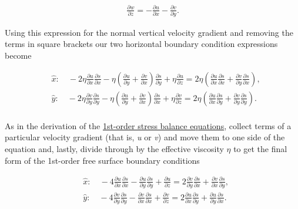\begin{align*}
\frac{\partial w}{\partial z}=-\frac{\partial u}{\partial x}-\frac{\partial v}{\partial y}.
\end{align*}

Using this expression for the normal vertical velocity gradient and removing the terms in square brackets our two horizontal boundary condition expressions become

\begin{align*}
   {} & \hat{x}:\quad -2\eta \frac{\partial u}{\partial x}\frac{\partial s}{\partial x}-\eta \left( \frac{\partial u}{\partial y}+\frac{\partial v}{\partial x} \right)\frac{\partial s}{\partial y}+\eta \frac{\partial u}{\partial z}=2\eta \left( \frac{\partial u}{\partial x}\frac{\partial s}{\partial x}+\frac{\partial v}{\partial y}\frac{\partial s}{\partial x} \right),  \\
   {} & \hat{y}:\quad -2\eta \frac{\partial v}{\partial y}\frac{\partial s}{\partial y}-\eta \left( \frac{\partial u}{\partial y}+\frac{\partial v}{\partial x} \right)\frac{\partial s}{\partial x}+\eta \frac{\partial v}{\partial z}=2\eta \left( \frac{\partial u}{\partial x}\frac{\partial s}{\partial y}+\frac{\partial v}{\partial y}\frac{\partial s}{\partial y} \right).  \\
\end{align*}

As in the derivation of the \href{http://websrv.cs.umt.edu/isis/index.php/Blatter-Pattyn_model}{1st-order stress balance equations}, collect terms of a particular velocity gradient (that is, \textit{u} or \textit{v}) and move them to one side of the equation and, lastly, divide through by the effective viscosity \textit{\(\eta{}\)} to get the final form of the 1st-order free surface boundary conditions

\begin{align*}
   {} & \hat{x}:\quad -4\frac{\partial u}{\partial x}\frac{\partial s}{\partial x}-\frac{\partial u}{\partial y}\frac{\partial s}{\partial y}+\frac{\partial u}{\partial z}=2\frac{\partial v}{\partial y}\frac{\partial s}{\partial x}+\frac{\partial v}{\partial x}\frac{\partial s}{\partial y},  \\
   {} & \hat{y}:\quad -4\frac{\partial v}{\partial y}\frac{\partial s}{\partial y}-\frac{\partial v}{\partial x}\frac{\partial s}{\partial x}+\frac{\partial v}{\partial z}=2\frac{\partial u}{\partial x}\frac{\partial s}{\partial y}+\frac{\partial u}{\partial y}\frac{\partial s}{\partial x}.  \\
\end{align*}


